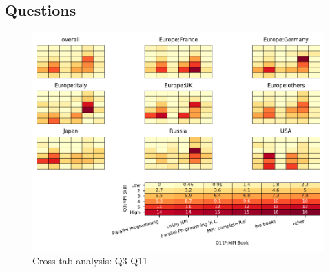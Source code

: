 
\subsection{Questions}


\begin{figure}
\begin{center}
\includegraphics[width=12cm]{../pdfs/Q3-Q11.pdf}
\caption{Cross-tab analysis: Q3-Q11}
\label{fig:Q3-Q11}
\end{center}
\end{figure}
